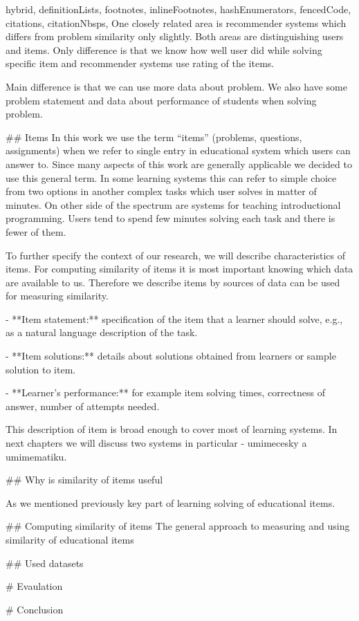 \documentclass[
  digital, %
  table,   %
  nolof,     %
  nolot,     %
  nocover
]{fithesis3}
\begin{document}
\begin{markdown*}{%
  hybrid,
  definitionLists,
  footnotes,
  inlineFootnotes,
  hashEnumerators,
  fencedCode,
  citations,
  citationNbsps,
}
One closely related area is recommender systems which differs from problem similarity only slightly. Both areas are distinguishing users and items. Only difference is that we know how well user did while solving specific item and recommender systems use rating of the items.

Main difference is that we can use more data about problem. We also have some problem statement and data about performance of students when solving problem.

## Items
In this work we use the term “items” (problems, questions, assignments) when we refer to single entry in educational system which users can answer to. Since many aspects of this work are generally applicable we decided to use this general term. In some learning systems this can refer to simple choice from two options in another complex tasks which user solves in matter of minutes.
On other side of the spectrum are systems for teaching introductional programming. Users tend to spend few minutes solving each task and there is fewer of them.

To further specify the context of our research, we will describe characteristics of items. For computing similarity of items it is most important knowing which data are available to us. Therefore we describe items by sources of data can be used for measuring similarity.

- **Item statement:** specification of the item that a learner should solve, e.g., as a natural language description of the task.

- **Item solutions:** details about solutions obtained from learners or sample solution to item.

- **Learner's performance:** for example item solving times, correctness of answer, number of attempts needed.

This description of item is broad enough to cover most of learning systems. In next chapters we will discuss two systems in particular - umimecesky a umimematiku.

## Why is similarity of items useful

As we mentioned previously key part of learning solving of educational items.

## Computing similarity of items
The general approach to measuring and using similarity of educational items

## Used datasets

# Evaulation



# Conclusion




\end{markdown*}
\end{document}
